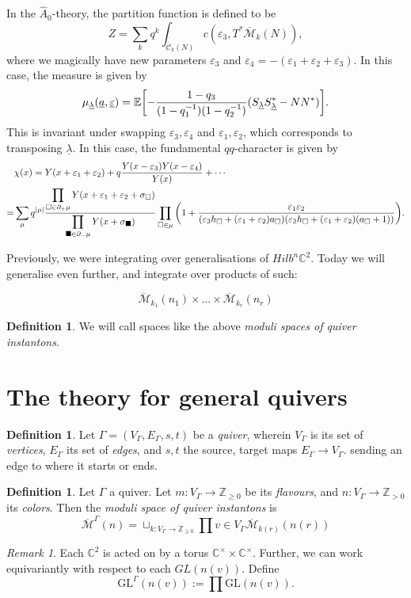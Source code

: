 \documentclass[leqno, openany]{memoir}
\theoremstyle{definition}
\newtheorem{defn}[thm]{Definition}
\theoremstyle{remark}
\newtheorem{rmk}[thm]{Remark}
\theoremstyle{plain}
\theoremstyle{definition}
\theoremstyle{remark}
\newcommand{\E}{\mathbb{E}}
\newcommand{\ep}{\varepsilon}
\newcommand{\mc}[1]{\mathcal{#1}}
\newcommand{\mr}[1]{\mathrm{#1}}
\newcommand{\ol}[1]{\overline{#1}}
\newcommand{\ul}[1]{\underline{#1}}
\newcommand{\wh}[1]{\widehat{#1}}
\newcommand{\GL}{\mr{GL}}
\begin{document}
In the $\wh{A}_0$-theory, the partition function is defined to be
\[ Z = \sum_k q^k \int_{\ol{\mc{C}}_k(N)} c(\ep_3, T^* \ol{\mc{M}}_k(N)), \]
where we magically have new parameters $\ep_3$ and $\ep_4 = -(\ep_1 + \ep_2 + \ep_3)$. In this case, the measure is given by
\[ \mu_{\ul{\lambda}}(\ul{a}, \ul{\ep}) = \E \qty[-\frac{1-q_3}{(1-q_1^{-1})(1-q_2^{-1})}(S_{\ul{\lambda}}S_{\ul{\lambda}}^* - NN^*)]. \]
This is invariant under swapping $\ep_3, \ep_4$ and $\ep_1, \ep_2$, which corresponds to transposing $\ul{\lambda}$. In this case, the fundamental $qq$-character is given by
\begin{align*}
    &\chi(x) = Y(x+\ep_1 + \ep_2) + q \frac{Y(x-\ep_3)Y(x-\ep_4)}{Y(x)} + \cdots \\
    =& \sum_{\mu} q^{\abs{\mu}} \frac{\displaystyle\prod_{\square \in \partial_+ \mu} Y(x+\ep_1+\ep_2+\sigma_{\square})}{\displaystyle\prod_{\blacksquare \in \partial_- \mu} Y(x + \sigma_{\blacksquare})} \prod_{\square \in \mu} \qty( 1 + \frac{\ep_1 \ep_2}{(\ep_3 h_{\square} + (\ep_1 + \ep_2) a_{\square})(\ep_3 h_{\square} + (\ep_1 + \ep_2)(a_{\square}+1))}).
\end{align*}



Previously, we were integrating over generalisations of $Hilb^n\mathbb{C}^2$. Today we will generalise even further, and integrate over products of such:

\[
\overline{\mathcal{M}}_{k_1}(n_1) \times \dots \times \overline{\mathcal{M}}_{k_r}(n_r)  
\]
 
\begin{defn}
  We will call spaces like the above \emph{moduli spaces of quiver instantons}.
\end{defn}

\section{The theory for general quivers} 
\begin{defn}
Let $\Gamma = (V_\Gamma, E_\Gamma, s,t)$ be a \emph{quiver}, 
wherein $V_\Gamma$ is its set of \emph{vertices}, $E_\Gamma$ its set of \emph{edges}, 
and $s,t$ the source, target maps $E_\Gamma \to V_\Gamma$. sending an edge to where it starts or ends.
\end{defn}

\begin{defn}
Let $\Gamma$ a quiver. Let $m : V_\Gamma \to \mathbb{Z}_{\geq 0}$ be its \emph{flavours}, and 
$n: V_\Gamma \to \mathbb{Z}_{>0}$ its \emph{colors}. 
Then the \emph{moduli space of quiver instantons} is
\[
\overline{\mathcal{M}}^\Gamma(n) = \sqcup_{k : V_\Gamma \to \mathbb{Z}_{\geq 0}} \prod{v \in V_\Gamma} \overline{\mathcal{M}}_{k(r)}(n(r))
\]
\end{defn}
\begin{rmk}
Each $\mathbb{C}^2$ is acted on by a torus $\mathbb{C}^\times \times \mathbb{C}^\times$. 
Further, we can work equivariantly with respect to each $GL(n(v))$. 
Define 
\[
\GL^\Gamma(n(v)) := \prod \GL(n(v)).
\]
\end{rmk}
\end{document}
